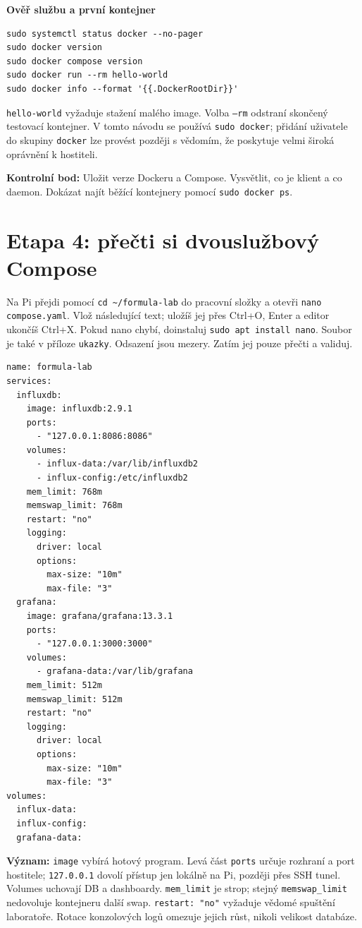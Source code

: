 \documentclass[11pt,a4paper]{article}
\newcommand{\krok}[1]{\par\noindent\textbf{#1}\par}
\newcommand{\kontrola}[1]{\par\noindent\textbf{Kontrolní bod:} #1\par}
\begin{document}
\krok{Ověř službu a první kontejner}
\begin{lstlisting}
sudo systemctl status docker --no-pager
sudo docker version
sudo docker compose version
sudo docker run --rm hello-world
sudo docker info --format '{{.DockerRootDir}}'
\end{lstlisting}
\texttt{hello-world} vyžaduje stažení malého image. Volba \texttt{--rm} odstraní skončený testovací kontejner. V tomto návodu se používá \texttt{sudo docker}; přidání uživatele do skupiny \texttt{docker} lze provést později s vědomím, že poskytuje velmi široká oprávnění k hostiteli.\cite{docker-postinstall}

\kontrola{Uložit verze Dockeru a Compose. Vysvětlit, co je klient a co daemon. Dokázat najít běžící kontejnery pomocí \texttt{sudo docker ps}.}

\clearpage
\section{Etapa 4: přečti si dvouslužbový Compose}
Na Pi přejdi pomocí \texttt{cd \textasciitilde/formula-lab} do pracovní složky a otevři \texttt{nano compose.yaml}. Vlož následující text; uložíš jej přes Ctrl+O, Enter a editor ukončíš Ctrl+X. Pokud nano chybí, doinstaluj \texttt{sudo apt install nano}. Soubor je také v příloze \texttt{ukazky}. Odsazení jsou mezery. Zatím jej pouze přečti a validuj.
\begin{lstlisting}[basicstyle=\ttfamily\scriptsize]
name: formula-lab
services:
  influxdb:
    image: influxdb:2.9.1
    ports:
      - "127.0.0.1:8086:8086"
    volumes:
      - influx-data:/var/lib/influxdb2
      - influx-config:/etc/influxdb2
    mem_limit: 768m
    memswap_limit: 768m
    restart: "no"
    logging:
      driver: local
      options:
        max-size: "10m"
        max-file: "3"
  grafana:
    image: grafana/grafana:13.3.1
    ports:
      - "127.0.0.1:3000:3000"
    volumes:
      - grafana-data:/var/lib/grafana
    mem_limit: 512m
    memswap_limit: 512m
    restart: "no"
    logging:
      driver: local
      options:
        max-size: "10m"
        max-file: "3"
volumes:
  influx-data:
  influx-config:
  grafana-data:
\end{lstlisting}
\textbf{Význam:} \texttt{image} vybírá hotový program. Levá část \texttt{ports} určuje rozhraní a port hostitele; \texttt{127.0.0.1} dovolí přístup jen lokálně na Pi, později přes SSH tunel. Volumes uchovají DB a dashboardy. \texttt{mem\_limit} je strop; stejný \texttt{memswap\_limit} nedovoluje kontejneru další swap. \texttt{restart: "no"} vyžaduje vědomé spuštění laboratoře. Rotace konzolových logů omezuje jejich růst, nikoli velikost databáze.\cite{docker-memory,volumes,grafana-docker,influx-compose}
\end{document}
